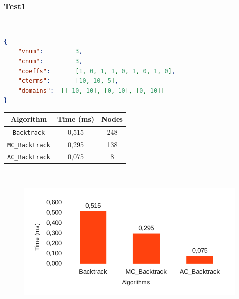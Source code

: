\documentclass{beamer}
\begin{document}
\begin{frame}[fragile]
\frametitle{Test1}
\hspace{1cm}~\begin{minipage}[c]{.9\textwidth}
\begin{lstlisting}[language=json, basicstyle=\small]
{
	"vnum": 		3,
	"cnum":			3,
	"coeffs":		[1, 0, 1, 1, 0, 1, 0, 1, 0],
	"cterms":		[10, 10, 5],
	"domains":	[[-10, 10], [0, 10], [0, 10]]
}
\end{lstlisting}
\end{minipage}
\begin{minipage}[c]{.35\linewidth}
\begin{footnotesize}
\begin{longtable}{c c c}
\toprule
\textbf{Algorithm} & \textbf{Time (ms)} & \textbf{Nodes}\\
\midrule
\texttt{Backtrack} & 0,515 & 248 \\
\midrule
\texttt{MC\_Backtrack} & 0,295 & 138 \\
\midrule
\texttt{AC\_Backtrack} & 0,075 & 8 \\
\bottomrule
\end{longtable}
\end{footnotesize}
\end{minipage}\hspace{1cm}~
\begin{minipage}[c]{.5\linewidth}
\begin{figure}[!h]
\begin{center}
\includegraphics[scale=0.55]{./report-images/test1_time.pdf}
\end{center}
\end{figure}
\end{minipage}
\end{frame}
\end{document}
